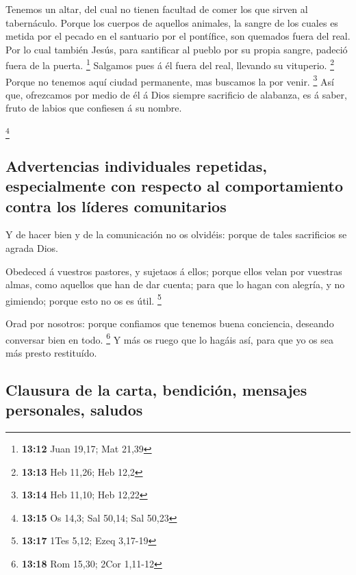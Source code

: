  Tenemos un altar, del cual no tienen facultad de comer
los que sirven al tabernáculo.  Porque los cuerpos de
aquellos animales, la sangre de los cuales es metida por el pecado en el
santuario por el pontífice, son quemados fuera del real. 
Por lo cual también Jesús, para santificar al pueblo por su propia
sangre, padeció fuera de la puerta. \footnote{\textbf{13:12} Juan 19,17;
  Mat 21,39}  Salgamos pues á él fuera del real, llevando
su vituperio. \footnote{\textbf{13:13} Heb 11,26; Heb 12,2}
 Porque no tenemos aquí ciudad permanente, mas buscamos
la por venir. \footnote{\textbf{13:14} Heb 11,10; Heb 12,22}
 Así que, ofrezcamos por medio de él á Dios siempre
sacrificio de alabanza, es á saber, fruto de labios que confiesen á su
nombre.

\footnote{\textbf{13:15} Os 14,3; Sal 50,14; Sal 50,23}

\hypertarget{advertencias-individuales-repetidas-especialmente-con-respecto-al-comportamiento-contra-los-luxedderes-comunitarios}{%
\subsection{Advertencias individuales repetidas, especialmente con
respecto al comportamiento contra los líderes
comunitarios}\label{advertencias-individuales-repetidas-especialmente-con-respecto-al-comportamiento-contra-los-luxedderes-comunitarios}}

 Y de hacer bien y de la comunicación no os olvidéis:
porque de tales sacrificios se agrada Dios.

 Obedeced á vuestros pastores, y sujetaos á ellos; porque
ellos velan por vuestras almas, como aquellos que han de dar cuenta;
para que lo hagan con alegría, y no gimiendo; porque esto no os es útil.
\footnote{\textbf{13:17} 1Tes 5,12; Ezeq 3,17-19}

 Orad por nosotros: porque confiamos que tenemos buena
conciencia, deseando conversar bien en todo. \footnote{\textbf{13:18}
  Rom 15,30; 2Cor 1,11-12}  Y más os ruego que lo hagáis
así, para que yo os sea más presto restituído.

\hypertarget{clausura-de-la-carta-bendiciuxf3n-mensajes-personales-saludos}{%
\subsection{Clausura de la carta, bendición, mensajes personales,
saludos}\label{clausura-de-la-carta-bendiciuxf3n-mensajes-personales-saludos}}

